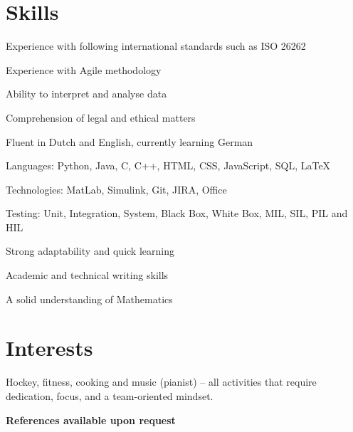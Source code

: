 	\section{Skills}
	
	\begin{splitcolentry}{
			\begin{highlights}
				\item Experience with following international standards such as ISO 26262
				\item Experience with Agile methodology 
				\item Ability to interpret and analyse data
				\item Comprehension of legal and ethical matters
				\item Fluent in Dutch and English, currently learning German
			\end{highlights}
		}
		\begin{highlights}
			\item Languages: Python, Java, C, C++, HTML, CSS, JavaScript, SQL, LaTeX
			\item Technologies: MatLab, Simulink, Git, JIRA, Office
			\item Testing: Unit, Integration, System, Black Box, White Box, MIL, SIL, PIL and HIL
			\item Strong adaptability and quick learning
			\item Academic and technical writing skills
			\item A solid understanding of Mathematics
		\end{highlights}
	\end{splitcolentry}
	
	\section{Interests}
	
	\begin{onecolentry}
		Hockey, fitness, cooking and music (pianist) – all activities that require dedication, focus, and a team-oriented mindset.
	\end{onecolentry}
	
	\vspace{0.2 cm}
	
	\begin{onecolentry}
		\begin{center}
			\textbf{References available upon request}
		\end{center}
	\end{onecolentry}

